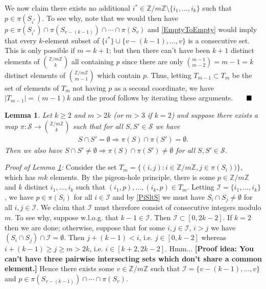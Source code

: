 \documentclass[journal, onecolumn]{IEEEtran}
\newtheorem{lemma}{Lemma}
\begin{document}
We now claim there exists no additional $i^* \in \mathbb{Z}/m\mathbb{Z} \setminus \{i_1, \ldots, i_k\}$ such that $p \in \pi(S_{i^*})$. To see why, note that we would then have $p \in \pi(S_{i^*}) \cap \pi(S_{v - (k-1)}) \cap \cdots \cap \pi(S_{v})$ and \eqref{EmptyToEmpty} would imply that every $k$-element subset of $\{i^*\} \cup \{v-(k-1), \ldots, v\}$ is a consecutive set. This is only possible if $m = k+1$; but then there can't have been $k+1$ distinct elements of ${\mathbb{Z}/m\mathbb{Z} \choose k}$ all containing $p$ since there are only ${m-1 \choose m-2}  = m-1 = k$ distinct elements of ${\mathbb{Z}/m\mathbb{Z} \choose m-1}$ which contain $p$. Thus, letting $T_{m-1} \subset T_m$ be the set of elements of $T_m$ not having $p$ as a second coordinate, we have $|T_{m-1}| = (m-1)k$ and the proof follows by iterating these arguments. $\indent \blacksquare$

\begin{lemma}\label{NonEmptyLemma} Let $k \geq 2$ and $m > 2k$ (or $m > 3$ if $k=2$) and suppose there exists a map $\pi: \mathcal{S} \to {\mathbb{Z}/m\mathbb{Z} \choose k}$ such that for all $S, S' \in \mathcal{S}$ we have
\begin{align}\label{PiSltS}
S \cap S' = \emptyset \Longrightarrow \pi(S) \cap \pi(S') = \emptyset .
\end{align}
Then we also have $S \cap S' \neq \emptyset \Longrightarrow \pi(S) \cap \pi(S') \neq \emptyset$ for all $S, S' \in \mathcal{S}$.
\end{lemma}

\emph{Proof of Lemma \ref{NonEmptyLemma}:} Consider the set $T_m = \{ (i,j) : i \in \mathbb{Z}/m\mathbb{Z}, j \in \pi(S_i)) \}$, which has $mk$ elements. By the pigeon-hole principle, there is some $p \in \mathbb{Z}/m\mathbb{Z}$ and $k$ distinct $i_1, \ldots, i_k$ such that $(i_1, p), \ldots, (i_k,p) \in T_m$. Letting $\mathcal{I} = \{i_1, \ldots, i_k\}$, we have $p \in \pi(S_i)$ for all $i \in \mathcal{I}$ and by \eqref{PiSltS} we must have $S_{i} \cap S_{j} \neq \emptyset$ for all $i, j \in \mathcal{I}$. We claim that $\mathcal{I}$ must therefore consist of consecutive integers modulo $m$. To see why, suppose w.l.o.g. that $k-1 \in \mathcal{I}$. Then $\mathcal{I} \subset [0, 2k-2]$. If $k=2$ then we are done; otherwise, suppose that for some $i, j \in \mathcal{I}$, $i > j$ we have $(S_i \cap S_j) \cap \mathcal{I} = \emptyset$. Then $j +(k-1) < i$, i.e. $j \in [0, k-2]$ whereas $i + (k-1) \geq j \geq m > 2k$, i.e. $i \in [k+2, 2k-2]$. Hmm... \textbf{[Proof idea: You can't have three pairwise intersecting sets which don't share a common element.]} Hence there exists some $v \in \mathbb{Z}/m\mathbb{Z}$ such that $\mathcal{I} = \{v - (k-1), \ldots, v\}$ and $p \in \pi(S_{v-(k-1)}) \cap \cdots \cap \pi(S_{v})$. 
\end{document}
